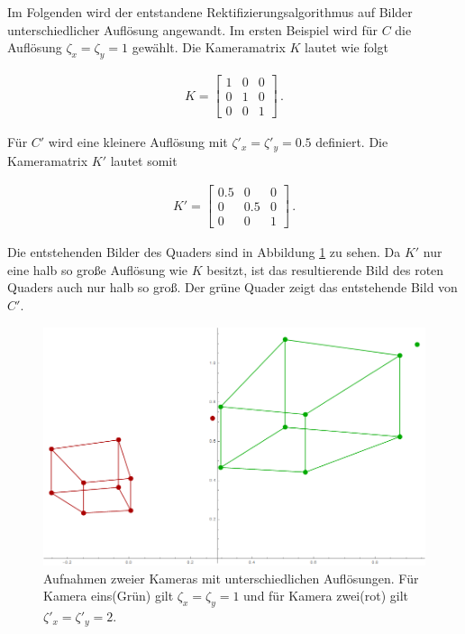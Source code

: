 Im Folgenden wird der entstandene Rektifizierungsalgorithmus auf Bilder unterschiedlicher Auflösung angewandt. Im ersten Beispiel wird für $C$ die Auflösung $\zeta_x = \zeta_y =1$ gewählt. Die Kameramatrix $K$ lautet wie folgt


\begin{gather}
	K = 
	\begin{bmatrix}
	1&0&0\\
	0&1&0\\
	0&0&1
	\end{bmatrix} \, .
\end{gather}

Für $C'$ wird eine kleinere Auflösung mit $\zeta'_x = \zeta'_y = 0.5$ definiert. Die Kameramatrix $K'$ lautet somit

\begin{gather}
K' = 
	\begin{bmatrix}
	0.5&0&0\\
	0&0.5&0\\
	0&0&1
	\end{bmatrix} \, .
\end{gather} 


Die entstehenden Bilder des Quaders sind in Abbildung \ref{fig:AbbRecDifRes} zu sehen. Da $K'$ nur eine halb so große Auflösung wie $K$ besitzt, ist das resultierende Bild des roten Quaders auch nur halb so groß. Der grüne Quader zeigt das entstehende Bild von $C'$.
\pagebreak

\begin{figure}[!htb]
	\centering
	\includegraphics[width=.8\linewidth]{images/Rectification_one_different_Solutions.png}
	\caption[virtuelle Aufnahme mit unterschiedlichen Auflösung für die Rektifizierung]{Aufnahmen zweier Kameras mit unterschiedlichen Auflösungen. Für Kamera eins(Grün) gilt \ensuremath{\zeta_x = \zeta_y = 1}  und für Kamera zwei(rot) gilt \ensuremath{\zeta'_x = \zeta'_y= 2}.} 
	\label{fig:AbbRecDifRes}
\end{figure}


